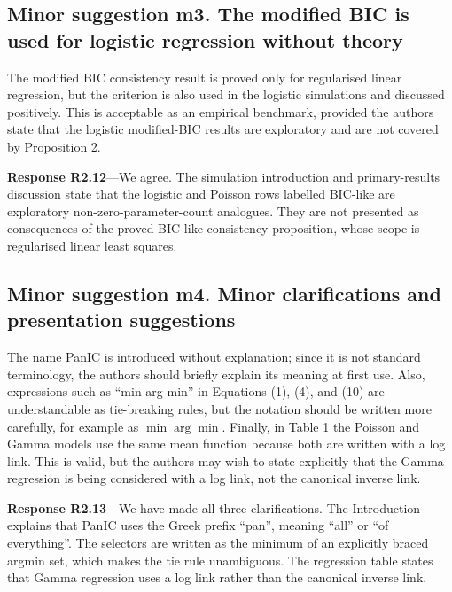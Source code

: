 \documentclass[11pt]{article}
\newcommand{\response}[1]{\par\noindent\textbf{Response #1}---}
\begin{document}
\subsection*{Minor suggestion m3. The modified BIC is used for logistic regression without theory}
The modified BIC consistency result is proved only for regularised linear regression, but the criterion is also used in the logistic simulations and discussed positively. This is acceptable as an empirical benchmark, provided the authors state that the logistic modified-BIC results are exploratory and are not covered by Proposition 2.

\response{R2.12}We agree. The simulation introduction and primary-results discussion state that the logistic and Poisson rows labelled BIC-like are exploratory non-zero-parameter-count analogues. They are not presented as consequences of the proved BIC-like consistency proposition, whose scope is regularised linear least squares.

\subsection*{Minor suggestion m4. Minor clarifications and presentation suggestions}
The name PanIC is introduced without explanation; since it is not standard terminology, the authors should briefly explain its meaning at first use. Also, expressions such as ``min arg min'' in Equations (1), (4), and (10) are understandable as tie-breaking rules, but the notation should be written more carefully, for example as $\min\arg\min$. Finally, in Table 1 the Poisson and Gamma models use the same mean function because both are written with a log link. This is valid, but the authors may wish to state explicitly that the Gamma regression is being considered with a log link, not the canonical inverse link.

\response{R2.13}We have made all three clarifications. The Introduction explains that PanIC uses the Greek prefix ``pan'', meaning ``all'' or ``of everything''. The selectors are written as the minimum of an explicitly braced argmin set, which makes the tie rule unambiguous. The regression table states that Gamma regression uses a log link rather than the canonical inverse link.
\end{document}
